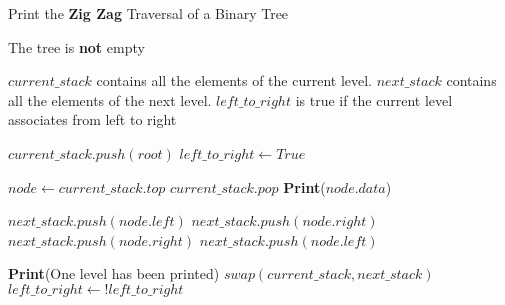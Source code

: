 \documentclass[12pt]{article}
\begin{document}
\begin{algorithm}
    
  \caption{Print the \textbf{Zig Zag} Traversal of a Binary Tree}
  
  
  \begin{algorithmic}[1]
    \Statex
    \Ensure The tree is \textbf{not} empty 
    
    \Statex
        \LeftComment $current\_stack$ contains all the elements of the current level. 
        \LeftComment $next\_stack$ contains all the elements of the next level.
        \LeftComment $left\_to\_right$ is true if the current level associates from left to right
        
        \Statex
        \State $current\_stack.push(root)$
        \State $left\_to\_right \gets True$
       
            
                \State $node \gets current\_stack.top$
                \State $current\_stack.pop$
                \State \textbf{Print}($node.data$)
                
                        \State $next\_stack.push(node.left)$
                    \EndIf
                        \State $next\_stack.push(node.right)$
                    \EndIf
                \Else
                        \State $next\_stack.push(node.right)$
                    \EndIf
                        \State $next\_stack.push(node.left)$
                    \EndIf
                \EndIf
                
            \EndWhile
            \State \textbf{Print}(One level has been printed)
            \State $swap(current\_stack, next\_stack)$ 
            \State $left\_to\_right \gets ! left\_to\_right$ 
        \EndWhile
    \EndFunction
  \end{algorithmic}
  
\end{algorithm}
\end{document}

